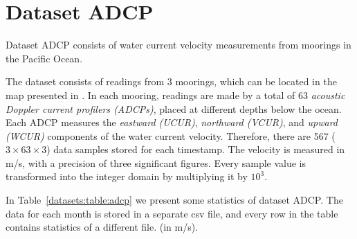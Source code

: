 
\vspace{-10pt}
\section{Dataset ADCP}
\label{datasets:adcp}


Dataset ADCP \cite{dataset:sst1} consists of water current velocity measurements from moorings in the Pacific Ocean. \TAODef


The dataset consists of readings from 3 moorings, which can be located in the map presented in \cite{dataset:sst1}. In each mooring, readings are made by a total of 63 \textit{acoustic Doppler current profilers (ADCPs)}, placed at different depths below the ocean. Each ADCP measures the \textit{eastward (UCUR)}, \textit{northward (VCUR)}, and \textit{upward (WCUR)} components of the water current velocity. Therefore, there are 567 ($3\times63\times3$) data samples stored for each timestamp. The velocity is measured in m/s, with a precision of three significant figures. Every sample value is transformed into the integer domain by multiplying it by $10^3$.


In Table~\ref{datasets:table:adcp} we present some statistics of dataset ADCP. The data for each month is stored in a separate csv file, and every row in the table contains statistics of a different file. \commonTable (in m/s).




